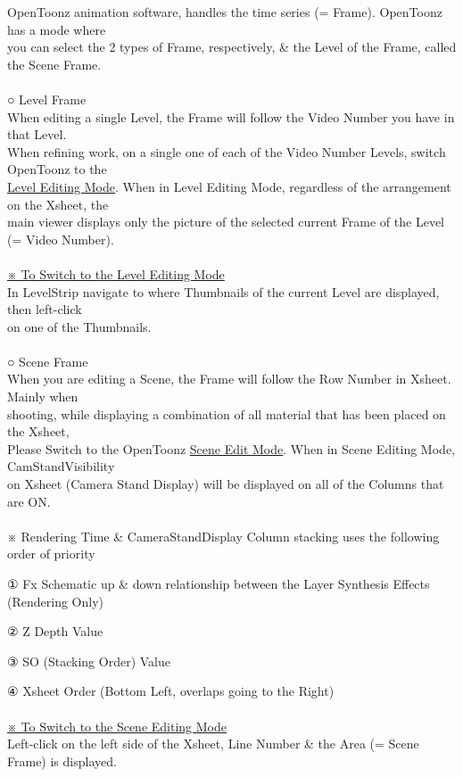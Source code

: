 \documentclass[a4paper,10pt]{article}
\begin{document}
\normalsize
\noindent OpenToonz animation software,  handles the time series (= Frame). OpenToonz has a mode where\\
you can select the 2 types of Frame, respectively, \& the Level of the Frame, called the Scene Frame.\\
\\
\large
○ Level Frame\\
\normalsize
When editing a single Level, the Frame will follow the Video Number you have in that Level.\\
When refining work, on a single one of each of the Video Number Levels, switch OpenToonz to the\\
\uline{Level Editing Mode}. When in Level Editing Mode, regardless of the arrangement on the Xsheet, the\\
main viewer displays only the picture of the selected current Frame of the Level (= Video Number).\\
\\
\uline{※ To Switch to the Level Editing Mode}\\
In LevelStrip navigate to where Thumbnails of the current Level are displayed, then left-click\\
on one of the Thumbnails.\\[0.5em]
\\
\large
○ Scene Frame\\
\normalsize
When you are editing a Scene, the Frame will follow the Row Number in Xsheet. Mainly when\\
shooting, while displaying a combination of all material that has been placed on the Xsheet,\\
Please Switch to the OpenToonz \uline{Scene Edit Mode}. When in Scene Editing Mode, CamStandVisibility\\
on Xsheet (Camera Stand Display) will be displayed on all of the Columns that are ON.\\
\\
※ Rendering Time \& CameraStandDisplay Column stacking uses the following order of priority\par
① Fx Schematic up \& down relationship between the Layer Synthesis Effects (Rendering Only)\par
② Z Depth Value\par
③ SO (Stacking Order) Value\par
④ Xsheet Order (Bottom Left, overlaps going to the Right)\\
\\
\uline{※ To Switch to the Scene Editing Mode}\\
Left-click on the left side of the Xsheet, Line Number \& the Area (= Scene Frame) is displayed.
\end{document}
